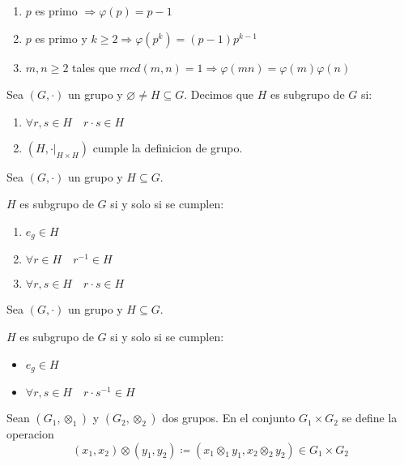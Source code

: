\begin{proposition}
	\begin{enumerate}
		\item \(p \) es primo \(\Rightarrow \varphi(p) = p - 1\)
		\item \(p \) es primo y \(k \geq 2 \Rightarrow \varphi(p^{k} ) = (p-1)p^{k-1 } \)
		\item \(m,n \geq 2 \) tales que \(mcd(m,n) = 1 \Rightarrow \varphi(mn) = \varphi(m) \varphi(n )\)
	\end{enumerate}
\end{proposition}
\begin{definition}
	Sea \((G, \cdot )\) un grupo y \(\varnothing \neq H \subseteq G \). Decimos que \(H \) es subgrupo de \(G \) si:
	\begin{enumerate}
		\item \(\forall r,s \in H \quad r \cdot s \in H \)
		\item \((H,\cdot|_{H \times H })\) cumple la definicion de grupo.
	\end{enumerate}
\end{definition}
\begin{proposition}
	Sea \((G, \cdot )\) un grupo y \(H \subseteq G \).
	
	\(H \) es subgrupo de \(G \) si y solo si se cumplen:
	\begin{enumerate}
		\item \(e_g \in H \)
		\item \(\forall r \in H \quad r^{-1} \in H \)
		\item \(\forall r,s \in H \quad r \cdot s \in H \)
	\end{enumerate}
\end{proposition}
\begin{proposition}
	Sea \((G, \cdot )\) un grupo y \(H \subseteq G \).
	
	\(H \) es subgrupo de \(G \) si y solo si se cumplen:
	\begin{itemize}
		\item \(e_g \in H \)
		\item \(\forall r,s \in H \quad r \cdot s^{-1} \in H \)
	\end{itemize}
\end{proposition}
\begin{definition}
	Sean \((G_1, \otimes_1)\) y \((G_2, \otimes_2 )\) dos grupos. En el conjunto \(G_1 \times G_2 \) se define la operacion
	\[
		(x_1,x_2) \otimes (y_1, y_2) \coloneqq (x_1 \otimes_1 y_1,x_2 \otimes_2 y_2 ) \in G_1 \times G_2
	\]
\end{definition}
